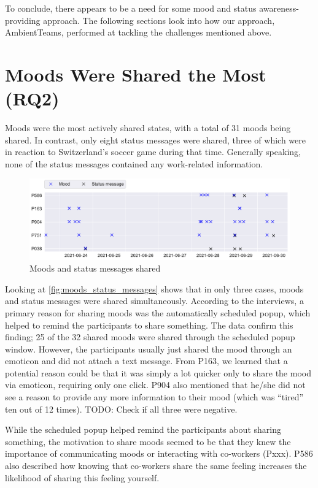 To conclude, there appears to be a need for some mood and status awareness-providing approach. The following sections look into how our approach, AmbientTeams, performed at tackling the challenges mentioned above.

\section{Moods Were Shared the Most  (RQ2)}
Moods were the most actively shared states, with a total of 31 moods being shared. In contrast, only eight status messages were shared, three of which were in reaction to Switzerland's soccer game during that time. Generally speaking, none of the status messages contained any work-related information.

\begin{figure}[h]
    \centering
    \includegraphics[width=\linewidth]{plots/moods_status_messages.pdf}
    \caption{Moods and status messages shared}
    \label{fig:moods_status_messages}
\end{figure}

Looking at \autoref{fig:moods_status_messages} shows that in only three cases, moods and status messages were shared simultaneously. According to the interviews, a primary reason for sharing moods was the automatically scheduled popup, which helped to remind the participants to share something. The data confirm this finding; 25 of the 32 shared moods were shared through the scheduled popup window. However, the participants usually just shared the mood through an emoticon and did not attach a text message. From P163, we learned that a potential reason could be that it was simply a lot quicker only to share the mood via emoticon, requiring only one click. P904 also mentioned that he/she did not see a reason to provide any more information to their mood (which was \enquote{tired} ten out of 12 times). TODO: Check if all three were negative.

While the scheduled popup helped remind the participants about sharing something, the motivation to share moods seemed to be that they knew the importance of communicating moods or interacting with co-workers (Pxxx). P586 also described how knowing that co-workers share the same feeling increases the likelihood of sharing this feeling yourself.

